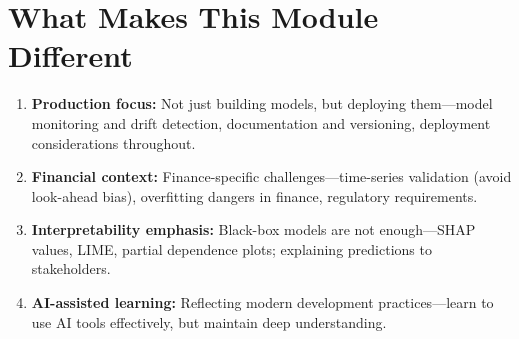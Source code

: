 \documentclass[11pt,a4paper]{article}
\begin{document}
\section{What Makes This Module Different}

\begin{enumerate}[leftmargin=*]
    \item \textbf{Production focus:} Not just building models, but deploying them---model monitoring and drift detection, documentation and versioning, deployment considerations throughout.
    
    \item \textbf{Financial context:} Finance-specific challenges---time-series validation (avoid look-ahead bias), overfitting dangers in finance, regulatory requirements.
    
    \item \textbf{Interpretability emphasis:} Black-box models are not enough---SHAP values, LIME, partial dependence plots; explaining predictions to stakeholders.
    
    \item \textbf{AI-assisted learning:} Reflecting modern development practices---learn to use AI tools effectively, but maintain deep understanding.
\end{enumerate}



\end{document}

